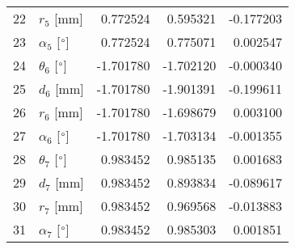 \documentclass{standalone}%
\begin{document}
\begin{tabular}{llrrr}
22 &              $r_{5}$ [mm] &  0.772524 &   0.595321 &  -0.177203 \\
23 &  $\alpha_{5}$ [$\degree$] &  0.772524 &   0.775071 &   0.002547 \\
24 &  $\theta_{6}$ [$\degree$] & -1.701780 &  -1.702120 &  -0.000340 \\
25 &              $d_{6}$ [mm] & -1.701780 &  -1.901391 &  -0.199611 \\
26 &              $r_{6}$ [mm] & -1.701780 &  -1.698679 &   0.003100 \\
27 &  $\alpha_{6}$ [$\degree$] & -1.701780 &  -1.703134 &  -0.001355 \\
28 &  $\theta_{7}$ [$\degree$] &  0.983452 &   0.985135 &   0.001683 \\
29 &              $d_{7}$ [mm] &  0.983452 &   0.893834 &  -0.089617 \\
30 &              $r_{7}$ [mm] &  0.983452 &   0.969568 &  -0.013883 \\
31 &  $\alpha_{7}$ [$\degree$] &  0.983452 &   0.985303 &   0.001851 \\
\bottomrule
\end{tabular}
%
\end{document}
